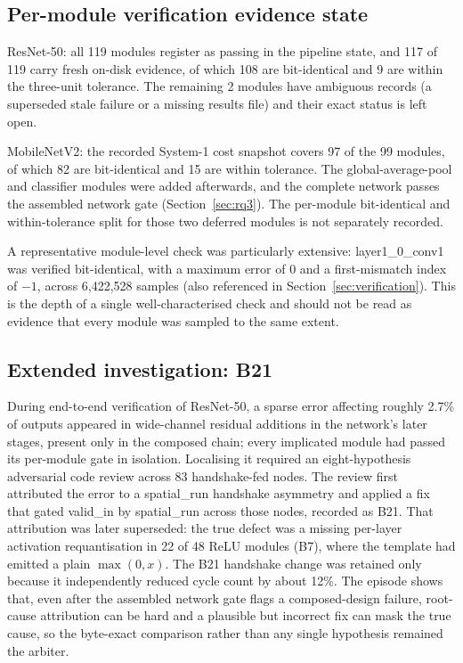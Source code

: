 \documentclass[acmtog,authorversion]{acmart}
\begin{document}
\subsection{Per-module verification evidence state}

ResNet-50: all 119 modules register as passing in the pipeline state, and 117 of 119 carry fresh on-disk evidence, of which 108 are bit-identical and 9 are within the three-unit tolerance. The remaining 2 modules have ambiguous records (a superseded stale failure or a missing results file) and their exact status is left open.

MobileNetV2: the recorded System-1 cost snapshot covers 97 of the 99 modules, of which 82 are bit-identical and 15 are within tolerance. The global-average-pool and classifier modules were added afterwards, and the complete network passes the assembled network gate (Section~\ref{sec:rq3}). The per-module bit-identical and within-tolerance split for those two deferred modules is not separately recorded.

A representative module-level check was particularly extensive: layer1\_0\_conv1 was verified bit-identical, with a maximum error of 0 and a first-mismatch index of $-1$, across 6,422,528 samples (also referenced in Section~\ref{sec:verification}). This is the depth of a single well-characterised check and should not be read as evidence that every module was sampled to the same extent.

\subsection{Extended investigation: B21}

During end-to-end verification of ResNet-50, a sparse error affecting roughly 2.7\% of outputs appeared in wide-channel residual additions in the network's later stages, present only in the composed chain; every implicated module had passed its per-module gate in isolation. Localising it required an eight-hypothesis adversarial code review across 83 handshake-fed nodes. The review first attributed the error to a spatial\_run handshake asymmetry and applied a fix that gated valid\_in by spatial\_run across those nodes, recorded as B21. That attribution was later superseded: the true defect was a missing per-layer activation requantisation in 22 of 48 ReLU modules (B7), where the template had emitted a plain \(\max(0,x)\). The B21 handshake change was retained only because it independently reduced cycle count by about 12\%. The episode shows that, even after the assembled network gate flags a composed-design failure, root-cause attribution can be hard and a plausible but incorrect fix can mask the true cause, so the byte-exact comparison rather than any single hypothesis remained the arbiter.
\end{document}
